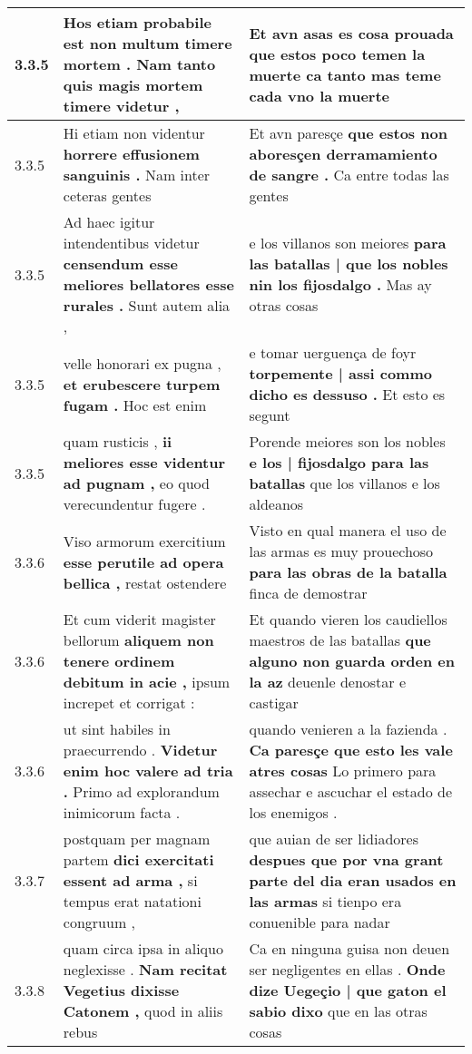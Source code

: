 \begin{tabular}{|p{1cm}|p{6.5cm}|p{6.5cm}|}
3.3.5 & Hos etiam probabile est \textbf{ non multum timere mortem . } Nam tanto quis magis mortem timere videtur , & Et avn asas es cosa prouada \textbf{ que estos poco temen la muerte } ca tanto mas teme cada vno la muerte \\\hline
3.3.5 & Hi etiam non videntur \textbf{ horrere effusionem sanguinis . } Nam inter ceteras gentes & Et avn paresçe \textbf{ que estos non aboresçen derramamiento de sangre . } Ca entre todas las gentes \\\hline
3.3.5 & Ad haec igitur intendentibus videtur \textbf{ censendum esse meliores bellatores esse rurales . } Sunt autem alia , & e los villanos son meiores \textbf{ para las batallas | que los nobles nin los fijosdalgo . } Mas ay otras cosas \\\hline
3.3.5 & velle honorari ex pugna , \textbf{ et erubescere turpem fugam . } Hoc est enim & e tomar uerguença de foyr \textbf{ torpemente | assi commo dicho es dessuso . } Et esto es segunt \\\hline
3.3.5 & quam rusticis , \textbf{ ii meliores esse videntur ad pugnam , } eo quod verecundentur fugere . & Porende meiores son los nobles \textbf{ e los | fijosdalgo para las batallas } que los villanos e los aldeanos \\\hline
3.3.6 & Viso armorum exercitium \textbf{ esse perutile ad opera bellica , } restat ostendere & Visto en qual manera el uso de las armas es muy prouechoso \textbf{ para las obras de la batalla } finca de demostrar \\\hline
3.3.6 & Et cum viderit magister bellorum \textbf{ aliquem non tenere ordinem debitum in acie , } ipsum increpet et corrigat : & Et quando vieren los caudiellos maestros de las batallas \textbf{ que alguno non guarda orden en la az } deuenle denostar e castigar \\\hline
3.3.6 & ut sint habiles in praecurrendo . \textbf{ Videtur enim hoc valere ad tria . } Primo ad explorandum inimicorum facta . & quando venieren a la fazienda . \textbf{ Ca paresçe que esto les vale atres cosas } Lo primero para assechar e ascuchar el estado de los enemigos . \\\hline
3.3.7 & postquam per magnam partem \textbf{ dici exercitati essent ad arma , } si tempus erat natationi congruum , & que auian de ser lidiadores \textbf{ despues que por vna grant parte del dia eran usados en las armas } si tienpo era conuenible para nadar \\\hline
3.3.8 & quam circa ipsa in aliquo neglexisse . \textbf{ Nam recitat Vegetius dixisse Catonem , } quod in aliis rebus & Ca en ninguna guisa non deuen ser negligentes en ellas . \textbf{ Onde dize Uegeçio | que gaton el sabio dixo } que en las otras cosas \\\hline

\end{tabular}
